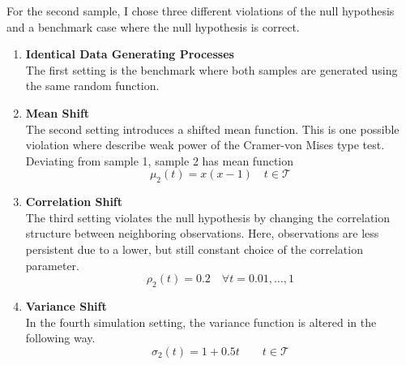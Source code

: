 \documentclass[12pt, a4paper]{article}
\theoremstyle{MAstyle} \newtheorem{assumption}{Assumption}[section]
\theoremstyle{MAstyle} \newtheorem{definition}{Definition}[section]
\theoremstyle{MAstyle} \newtheorem{theorem}{Theorem}[section]
\begin{document}
		For the second sample, I chose three different violations of the null hypothesis and a benchmark case where the null hypothesis is correct.
		\begin{enumerate}
			\item \textbf{Identical Data Generating Processes}\\
				  The first setting is the benchmark where both samples are generated using the same random function.
			\item \textbf{Mean Shift}\\
				  The second setting introduces a shifted mean function. This is one possible violation where \cite{bugni_permutation_2021} describe weak power of the Cramer-von Mises type test. Deviating from sample 1, sample 2 has mean function 
				  $$\mu_2(t) = x (x-1) \quad t \in \mathcal{T}$$
			\item \textbf{Correlation Shift}\\
			 	  The third setting violates the null hypothesis by changing the correlation structure between neighboring observations. Here, observations are less persistent due to a lower, but still constant choice of the correlation parameter.
			 	  $$\rho_2(t) = 0.2 \quad \forall t = 0.01, \dots, 1$$
			\item \textbf{Variance Shift}\\
				  In the fourth simulation setting, the variance function is altered in the following way.
				  $$\sigma_2(t) = 1 + 0.5t \quad \quad t \in \mathcal{T}$$
		\end{enumerate}
	
\end{document}
